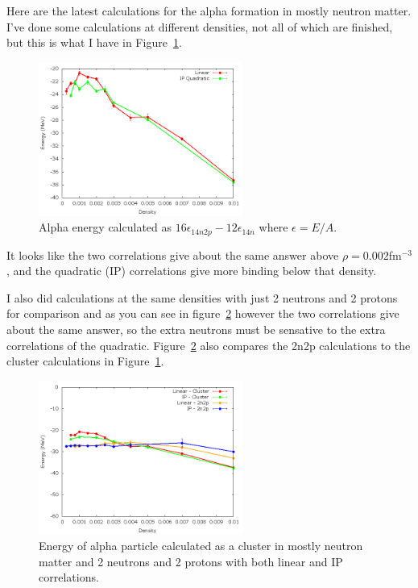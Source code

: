 \documentclass[12pt]{article}
\begin{document}

Here are the latest calculations for the alpha formation in mostly neutron matter. I've done some calculations at different densities, not all of which are finished, but this is what I have in Figure~\ref{fig:alpha}.
\begin{figure}[h!]
   \centering
   \includegraphics[width=0.60\textwidth]{../../alpha.png}
   \caption{Alpha energy calculated as $16\epsilon_{14n2p}-12\epsilon_{14n}$ where $\epsilon=E/A$.}
   \label{fig:alpha}
\end{figure}
It looks like the two correlations give about the same answer above $\rho=0.002$fm$^{-3}$, and the quadratic (IP) correlations give more binding below that density.

I also did calculations at the same densities with just 2 neutrons and 2 protons for comparison and as you can see in figure~\ref{fig:alpha_and_2n2p} however the two correlations give about the same answer, so the extra neutrons must be sensative to the extra correlations of the quadratic. Figure~\ref{fig:alpha_and_2n2p} also compares the 2n2p calculations to the cluster calculations in Figure~\ref{fig:alpha}.
\begin{figure}[h!]
   \centering
   \includegraphics[width=0.60\textwidth]{../../alpha_and_2n2p.png}
   \caption{Energy of alpha particle calculated as a cluster in mostly neutron matter and 2 neutrons and 2 protons with both linear and IP correlations.}
   \label{fig:alpha_and_2n2p}
\end{figure}
\end{document}
